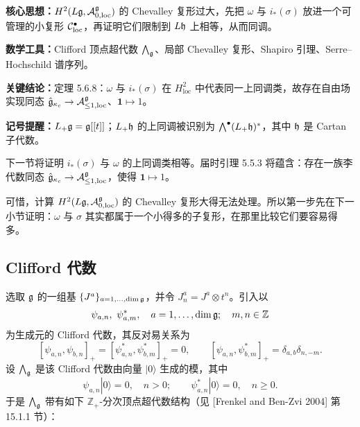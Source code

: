 \begin{keypoints}
    \item \textbf{核心思想：}$H^2(L\mathfrak{g},\mathcal{A}^{\mathfrak{g}}_{0,\mathrm{loc}})$ 的 Chevalley 复形过大，先把 $\omega$ 与 $i_*(\sigma)$ 放进一个可管理的小复形 $\mathcal{C}^\bullet_{\mathrm{loc}}$，再证明它们限制到 $L\mathfrak{h}$ 上相等，从而同调。
    \item \textbf{数学工具：}Clifford 顶点超代数 $\bigwedge_{\mathfrak{g}}$、局部 Chevalley 复形、Shapiro 引理、Serre--Hochschild 谱序列。
    \item \textbf{关键结论：}定理 5.6.8：$\omega$ 与 $i_*(\sigma)$ 在 $H^2_{\mathrm{loc}}$ 中代表同一上同调类，故存在自由场实现同态 $\hat{\mathfrak{g}}_{\kappa_c}\to\mathcal{A}^{\mathfrak{g}}_{\le1,\mathrm{loc}}$、$\mathbf{1}\mapsto 1$。
    \item \textbf{记号提醒：}$L_+\mathfrak{g} = \mathfrak{g}[[t]]$；$L_+\mathfrak{h}$ 的上同调被识别为 $\bigwedge^\bullet(L_+\mathfrak{h})^*$，其中 $\mathfrak{h}$ 是 Cartan 子代数。
\end{keypoints}

下一节将证明 $i_*(\sigma)$ 与 $\omega$ 的上同调类相等。届时引理 5.5.3 将蕴含：存在一族李代数同态 $\hat{\mathfrak{g}}_{\kappa_c}\to\mathcal{A}^{\mathfrak{g}}_{\le1,\mathrm{loc}}$，使得 $\mathbf{1}\mapsto 1$。

可惜，计算 $H^2(L\mathfrak{g},\mathcal{A}^{\mathfrak{g}}_{0,\mathrm{loc}})$ 的 Chevalley 复形大得无法处理。所以第一步先在下一小节证明：$\omega$ 与 $\sigma$ 其实都属于一个小得多的子复形，在那里比较它们要容易得多。

\subsection{Clifford 代数}

选取 $\mathfrak{g}$ 的一组基 $\{J^a\}_{a=1,\dots,\dim\mathfrak{g}}$，并令 $J^a_n = J^a\otimes t^n$。引入以
\[
\psi_{a,n},\ \psi^*_{a,m},\quad a=1,\dots,\dim\mathfrak{g};\quad m,n\in\mathbb{Z}
\]
为生成元的 Clifford 代数，其反对易关系为
\[
[\psi_{a,n},\psi_{b,n}]_+ = [\psi^*_{a,n},\psi^*_{b,m}]_+ = 0,\qquad
[\psi_{a,n},\psi^*_{b,m}]_+ = \delta_{a,b}\delta_{n,-m}.
\]
设 $\bigwedge_{\mathfrak{g}}$ 是该 Clifford 代数由向量 $|0\rangle$ 生成的模，其中
\[
\psi_{a,n}|0\rangle = 0,\quad n>0;\qquad \psi^*_{a,n}|0\rangle = 0,\quad n\ge 0.
\]
于是 $\bigwedge_{\mathfrak{g}}$ 带有如下 $\mathbb{Z}_+$-分次顶点超代数结构（见 [Frenkel and Ben-Zvi 2004] 第 15.1.1 节）：

